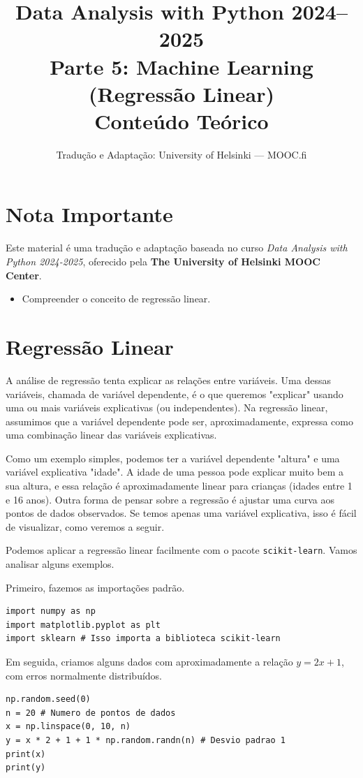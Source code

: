 \documentclass[11pt,a4paper]{article}
\title{\textbf{Data Analysis with Python 2024--2025}\\Parte 5: Machine Learning (Regressão Linear)\\\large Conteúdo Teórico}
\author{Tradução e Adaptação: University of Helsinki --- MOOC.fi}
\date{}
\begin{document}
\maketitle

\section*{Nota Importante}
Este material é uma tradução e adaptação baseada no curso \textit{Data Analysis with Python 2024-2025}, oferecido pela \textbf{The University of Helsinki MOOC Center}.

\begin{objetivos}
\begin{itemize}
    \item Compreender o conceito de regressão linear.
\end{itemize}
\end{objetivos}

\tableofcontents
\newpage

\section{Regressão Linear}

A análise de regressão tenta explicar as relações entre variáveis. Uma dessas variáveis, chamada de variável dependente, é o que queremos "explicar" usando uma ou mais variáveis explicativas (ou independentes). Na regressão linear, assumimos que a variável dependente pode ser, aproximadamente, expressa como uma combinação linear das variáveis explicativas. 

Como um exemplo simples, podemos ter a variável dependente "altura" e uma variável explicativa "idade". A idade de uma pessoa pode explicar muito bem a sua altura, e essa relação é aproximadamente linear para crianças (idades entre 1 e 16 anos). Outra forma de pensar sobre a regressão é ajustar uma curva aos pontos de dados observados. Se temos apenas uma variável explicativa, isso é fácil de visualizar, como veremos a seguir.

Podemos aplicar a regressão linear facilmente com o pacote \texttt{scikit-learn}. Vamos analisar alguns exemplos.

Primeiro, fazemos as importações padrão.
\begin{lstlisting}
import numpy as np
import matplotlib.pyplot as plt
import sklearn # Isso importa a biblioteca scikit-learn
\end{lstlisting}

Em seguida, criamos alguns dados com aproximadamente a relação $y = 2x + 1$, com erros normalmente distribuídos.
\begin{lstlisting}
np.random.seed(0)
n = 20 # Numero de pontos de dados
x = np.linspace(0, 10, n)
y = x * 2 + 1 + 1 * np.random.randn(n) # Desvio padrao 1
print(x)
print(y)
\end{lstlisting}
\end{document}
